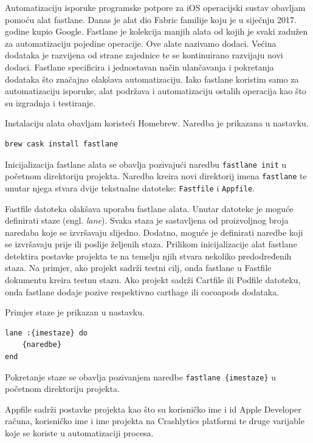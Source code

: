 \documentclass[times, utf8, diplomski, numeric]{fer}
\newcommand{\eng}[1]{(engl. \textit{#1})}
\begin{document}
\begin{appendices}
Automatizaciju isporuke programske potpore za iOS operacijski sustav obavljam pomoću alat fastlane. Danas je alat dio Fabric familije koju je u siječnju 2017. godine kupio Google. Fastlane je kolekcija manjih alata od kojih je svaki zadužen za automatizaciju pojedine operacije. Ove alate nazivamo dodaci. Većina dodataka je razvijena od strane zajednice te se kontinuirano razvijaju novi dodaci. Fastlane specificira i jednostavan način ulančavanja i pokretanja dodataka što značajno olakšava automatizaciju. Iako fastlane koristim samo za automatizaciju isporuke, alat podržava i automatizaciju ostalih operacija kao što su izgradnja i testiranje\citep{fastlane}.

Instalaciju alata obavljam koristeći Homebrew. Naredba je prikazana u nastavku.

\begin{verbatim}
brew cask install fastlane
\end{verbatim}

Inicijalizacija fastlane alata se obavlja pozivajući naredbu \verb|fastlane init| u početnom direktoriju projekta. Naredba kreira novi direktorij imena \verb|fastlane| te unutar njega stvara dvije tekstualne datoteke: \verb|Fastfile| i \verb|Appfile|.

Fastfile datoteka olakšava uporabu fastlane alata. Unutar datoteke je moguće definirati staze \eng{lane}. Svaka staza je sastavljena od proizvoljnog broja naredaba koje se izvršavaju slijedno. Dodatno, moguće je definirati naredbe koji se izvršavaju prije ili poslije željenih staza. Prilikom inicijalizacije alat fastlane detektira postavke projekta te na temelju njih stvara nekoliko predodređenih staza. Na primjer, ako projekt sadrži testni cilj, onda fastlane u Fastfile dokumentu kreira testnu stazu. Ako projekt sadrži Cartfile ili Podfile datoteku, onda fastlane dodaje pozive respektivno carthage ili cocoapods dodataka.

Primjer staze je prikazan u nastavku.

\begin{verbatim}
lane :{imestaze} do
    {naredbe}
end
\end{verbatim}

Pokretanje staze se obavlja pozivanjem naredbe \verb|fastlane {imestaze}| u početnom direktoriju projekta.

Appfile sadrži postavke projekta kao što su korisničko ime i id Apple Developer računa, korisničko ime i ime projekta na Crashlytics platformi te druge varijable koje se koriste u automatizaciji procesa.


\end{appendices}
\end{document}
